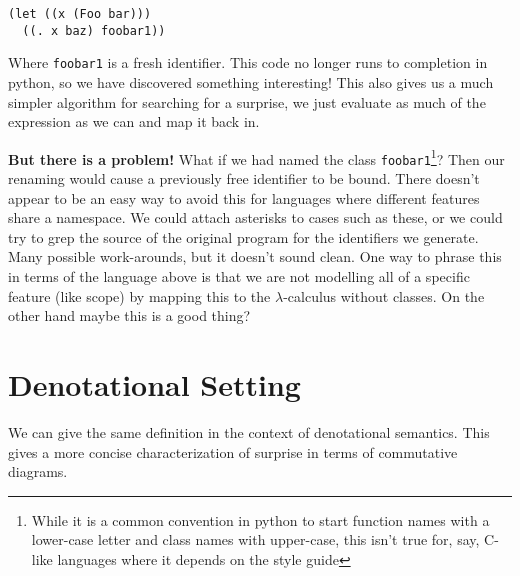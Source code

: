 \documentclass[12pt]{article}
\begin{document}
\begin{verbatim}
(let ((x (Foo bar)))
  ((. x baz) foobar1))
\end{verbatim}

Where \texttt{foobar1} is a fresh identifier. This code no longer runs to
completion in python, so we have discovered something interesting! This also
gives us a much simpler algorithm for searching for a surprise, we just
evaluate as much of the expression as we can and map it back in.

\textbf{But there is a problem!} What if we had named the class
\texttt{foobar1}\footnote{While it is a common convention in python to start
  function names with a lower-case letter and class names with upper-case,
  this isn't true for, say, C-like languages where it depends on the style
guide}? Then our renaming would cause a previously free identifier to be
bound. There doesn't appear to be an easy way to avoid this for languages
where different features share a namespace. We could attach asterisks to
cases such as these, or we could try to grep the source of the original
program for the identifiers we generate. Many possible work-arounds, but it
doesn't sound clean. One way to phrase this in terms of the language above
is that we are not modelling all of a specific feature (like scope) by
mapping this to the $\lambda$-calculus without classes. On the other hand
maybe this is a good thing?




\section{Denotational Setting}
We can give the same definition in the context of denotational semantics. This
gives a more concise characterization of surprise in terms of commutative
diagrams.

\end{document}
